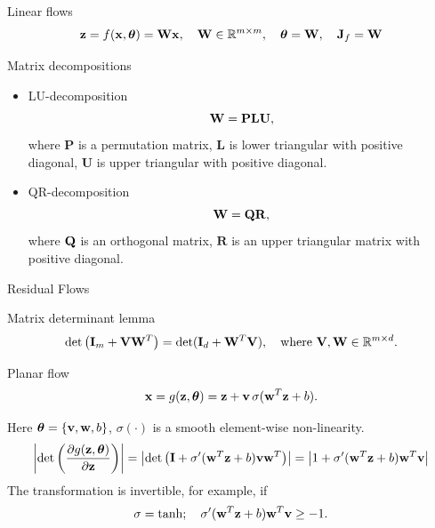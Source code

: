 \begin{frame}{Linear flows}
	\vspace{-0.3cm}
	\[
		\mathbf{z} = f(\mathbf{x}, \boldsymbol{\theta}) = \mathbf{W} \mathbf{x}, \quad \mathbf{W} \in \mathbb{R}^{m \times m}, \quad \boldsymbol{\theta} = \mathbf{W}, \quad \mathbf{J}_f = \mathbf{W}
	\]
	\vspace{-0.3cm}
	\begin{block}{Matrix decompositions}
		\begin{itemize}
			\item LU-decomposition
			\[
				\mathbf{W} = \mathbf{P} \mathbf{L} \mathbf{U},
			\]
			where $\mathbf{P}$ is a permutation matrix, $\mathbf{L}$ is lower triangular with positive diagonal, $\mathbf{U}$ is upper triangular with positive diagonal.
			\item QR-decomposition
			\[
				\mathbf{W} = \mathbf{Q} \mathbf{R},
			\]
			where $\mathbf{Q}$ is an orthogonal matrix, $\mathbf{R}$ is an upper triangular matrix with positive diagonal.
		\end{itemize}
	\end{block}

\end{frame}
\begin{frame}{Residual Flows}
	\begin{block}{Matrix determinant lemma}
		\vspace{-0.5cm}
		\[
			\det \left( \mathbf{I}_m + \mathbf{V} \mathbf{W}^T \right) = \det ( \mathbf{I}_d + \mathbf{W}^T \mathbf{V} ), \quad \text{where } \mathbf{V}, \mathbf{W} \in \mathbb{R}^{m \times d}.
		\]
		\vspace{-0.5cm}
	\end{block}
	\begin{block}{Planar flow}
		\vspace{-0.2cm}
		\[
			\mathbf{x} = g(\mathbf{z}, \boldsymbol{\theta}) = \mathbf{z} + \mathbf{v} \, \sigma(\mathbf{w}^T\mathbf{z} + b).
		\]
		\vspace{-0.3cm}
	\end{block}
	Here $\boldsymbol{\theta} = \{\mathbf{v}, \mathbf{w}, b\}$, $\sigma(\cdot)$ is a smooth element-wise non-linearity.
	{\small
	\[
		\left| \det \left( \frac{\partial g(\mathbf{z}, \boldsymbol{\theta})}{\partial \mathbf{z}} \right)\right| = \left| \det \left( \mathbf{I} + \sigma'(\mathbf{w}^T \mathbf{z} + b) \mathbf{v} \mathbf{w}^T\right) \right| = \left| 1 + \sigma'(\mathbf{w}^T \mathbf{z} + b) \mathbf{w}^T \mathbf{v} \right|
	\]}
	The transformation is invertible, for example, if
	\[
		\sigma = \tanh; \quad \sigma'(\mathbf{w}^T \mathbf{z} + b) \mathbf{w}^T \mathbf{v} \geq -1.
	\]
\end{frame}
